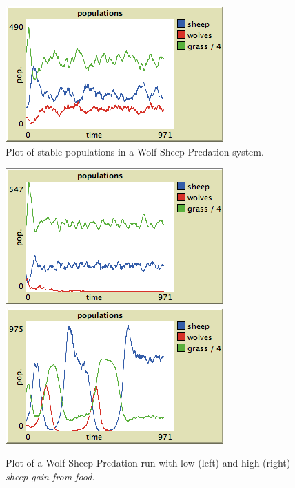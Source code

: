 \begin{figure}[ht]
\centering
\includegraphics[scale=.666667]{images/wolfsheep/wolfsheep_normal.png}
\caption{Plot of stable populations in a Wolf Sheep Predation system.}
\label{fig:wsp_norm}
\end{figure}


\begin{figure}[ht]
\centering
\includegraphics[scale=.666667]{images/wolfsheep/sheepfood_low.png}
\includegraphics[scale=.666667]{images/wolfsheep/sheepfood_high.png}
\caption{Plot of a Wolf Sheep Predation run with low (left) and high (right) \textit{sheep-gain-from-food}.}
\label{fig:wsp_sheepfood}
\end{figure}


